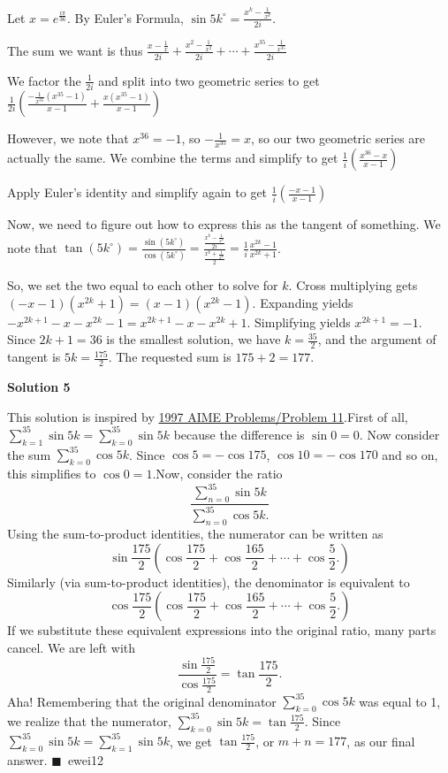 \begin{enumerate}
Let $x=e^{\frac{i\pi}{36}}$. By Euler's Formula, $\sin{5k^\circ}=\frac{x^k-\frac{1}{x^{k}}}{2i}$.

 The sum we want is thus $\frac{x-\frac{1}{x}}{2i}+\frac{x^2-\frac{1}{x^{2}}}{2i}+\cdots+\frac{x^{35}-\frac{1}{x^{35}}}{2i}$

 We factor the $\frac{1}{2i}$ and split into two geometric series to get $\frac{1}{2i}\left(\frac{-\frac{1}{x^{35}}(x^{35}-1)}{x-1}+\frac{x(x^{35}-1)}{x-1}\right)$

 However, we note that $x^{36}=-1$, so $-\frac{1}{x^{35}}=x$, so our two geometric series are actually the same. We combine the terms and simplify to get $\frac{1}{i}\left(\frac{x^{36}-x}{x-1}\right)$

 Apply Euler's identity and simplify again to get $\frac{1}{i}\left(\frac{-x-1}{x-1}\right)$

 Now, we need to figure out how to express this as the tangent of something. We note that $\tan(5k^\circ)=\frac{\sin(5k^\circ)}{\cos(5k^\circ)}=\frac{\frac{x^k-\frac{1}{x^k}}{2i}}{\frac{x^k+\frac{1}{x^k}}{2}}=\frac{1}{i}\frac{x^{2k}-1}{x^{2k}+1}$.

 So, we set the two equal to each other to solve for $k$. Cross multiplying gets $(-x-1)(x^{2k}+1)=(x-1)(x^{2k}-1)$. Expanding yields $-x^{2k+1}-x-x^{2k}-1=x^{2k+1}-x-x^{2k}+1$. Simplifying yields $x^{2k+1}=-1$. Since $2k+1=36$ is the smallest solution, we have $k=\frac{35}{2}$, and the argument of tangent is $5k=\frac{175}{2}$. The requested sum is $175+2=\boxed{177}$.

 



\textbf{Solution 5}

This solution is inspired by \href{https://artofproblemsolving.com/wiki/index.php?title=1997\_AIME\_Problems/Problem\_11}{1997 AIME Problems/Problem 11}.First of all, $\sum_{k=1}^{35}\sin 5k=\sum_{k=0}^{35}\sin 5k$ because the difference is $\sin 0 = 0$. Now consider the sum $\sum_{k=0}^{35}\cos 5k$. Since $\cos 5=-\cos 175$, $\cos 10=-\cos 170$ and so on, this simplifies to $\cos 0=1$.Now, consider the ratio
 \[\dfrac{\sum\limits_{n=0}^{35}\sin 5k}{\sum\limits_{n=0}^{35}\cos 5k.}\]Using the sum-to-product identities, the numerator can be written as 
 \[\sin \frac{175}{2} (\cos \frac{175}{2} + \cos \frac {165}{2}+\cdots + \cos \frac{5}{2}.)\]Similarly (via sum-to-product identities), the denominator is equivalent to 
 \[\cos \frac{175}{2} (\cos \frac{175}{2} + \cos \frac {165}{2}+\cdots + \cos \frac{5}{2}.)\]If we substitute these equivalent expressions into the original ratio, many parts cancel. We are left with
 \[\frac{\sin \frac{175}{2}}{\cos \frac{175}{2}} = \tan{\frac{175}{2}}.\]Aha! Remembering that the original denominator $\sum_{k=0}^{35}\cos 5k$ was equal to 1, we realize that the numerator, $\sum_{k=0}^{35}\sin 5k=\tan{\frac{175}{2}}$. Since $\sum_{k=0}^{35}\sin 5k=\sum_{k=1}^{35}\sin 5k$, we get $\tan \frac{175}{2}$, or $m+n=\boxed{177}$, as our final answer. $\blacksquare$~ewei12


\end{enumerate}
